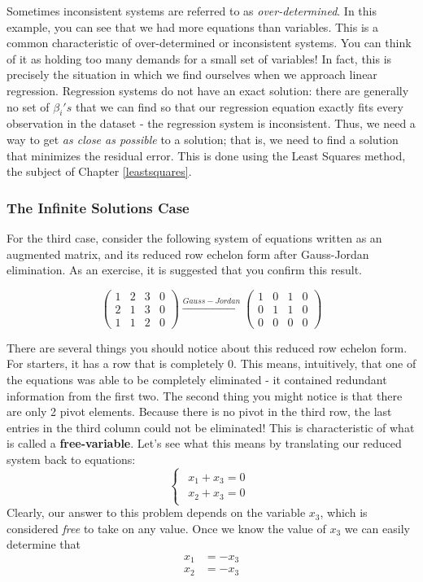 \documentclass[
]{article}
\theoremstyle{definition}
\theoremstyle{definition}
\theoremstyle{definition}
\theoremstyle{definition}
\theoremstyle{remark}
\begin{document}
Sometimes inconsistent systems are referred to as \emph{over-determined}. In this example, you can see that we had more equations than variables. This is a common characteristic of over-determined or inconsistent systems. You can think of it as holding too many demands for a small set of variables! In fact, this is precisely the situation in which we find ourselves when we approach linear regression. Regression systems do not have an exact solution: there are generally no set of \(\beta_i's\) that we can find so that our regression equation exactly fits every observation in the dataset - the regression system is inconsistent. Thus, we need a way to get \emph{as close as possible} to a solution; that is, we need to find a solution that minimizes the residual error. This is done using the Least Squares method, the subject of Chapter \ref{leastsquares}.

\hypertarget{infinitesol}{%
\subsubsection{The Infinite Solutions Case}\label{infinitesol}}

For the third case, consider the following system of equations written as an augmented matrix, and its reduced row echelon form after Gauss-Jordan elimination. As an exercise, it is suggested that you confirm this result.

\[\left(\begin{array}{rrr|r} 1&2&3&0\\2&1&3&0\\1&1&2&0\end{array}\right) \xrightarrow{Gauss-Jordan} \left(\begin{array}{rrr|r} 1&0&1&0\\0&1&1&0\\0&0&0&0\end{array}\right) \]

There are several things you should notice about this reduced row echelon form. For starters, it has a row that is completely 0. This means, intuitively, that one of the equations was able to be completely eliminated - it contained redundant information from the first two. The second thing you might notice is that there are only 2 pivot elements. Because there is no pivot in the third row, the last entries in the third column could not be eliminated! This is characteristic of what is called a \textbf{free-variable}. Let's see what this means by translating our reduced system back to equations:
\[\begin{cases}\begin{align}
x_1+x_3 = 0\\
x_2+x_3= 0\end{align}\end{cases}\]
Clearly, our answer to this problem depends on the variable \(x_3\), which is considered \emph{free} to take on any value. Once we know the value of \(x_3\) we can easily determine that
\begin{align}
x_1 &= -x_3 \\
x_2 &= -x_3 \end{align}
\end{document}
